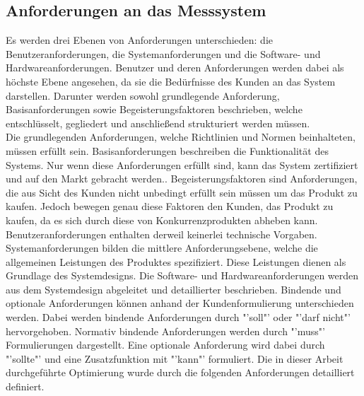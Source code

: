 \subsection{Anforderungen an das Messsystem}\label{sec:anforderungen}
Es werden drei Ebenen von Anforderungen unterschieden: die Benutzeranforderungen, die Systemanforderungen und die Software- und Hardwareanforderungen.\newline
Benutzer und deren Anforderungen werden dabei als höchste Ebene angesehen, da sie die Bedürfnisse des Kunden an das System darstellen. Darunter werden sowohl grundlegende Anforderung, Basisanforderungen sowie Begeisterungsfaktoren beschrieben, welche entschlüsselt, gegliedert und anschließend strukturiert werden müssen.\\
Die grundlegenden Anforderungen, welche Richtlinien und Normen beinhalteten, müssen erfüllt sein. Basisanforderungen beschreiben die Funktionalität des Systems. Nur wenn diese Anforderungen erfüllt sind, kann das System zertifiziert und auf den Markt gebracht werden.. Begeisterungsfaktoren sind Anforderungen, die aus Sicht des Kunden nicht unbedingt erfüllt sein müssen um das Produkt zu kaufen. Jedoch bewegen genau diese Faktoren den Kunden, das Produkt zu kaufen, da es sich durch diese von Konkurrenzprodukten abheben kann. Benutzeranforderungen enthalten derweil keinerlei technische Vorgaben.\newline
Systemanforderungen bilden die mittlere Anforderungsebene, welche die allgemeinen Leistungen des Produktes spezifiziert. Diese Leistungen dienen als Grundlage des Systemdesigns.\newline
Die Software- und Hardwareanforderungen werden aus dem Systemdesign abgeleitet und detaillierter beschrieben.\newline %
Bindende und optionale Anforderungen können anhand der Kundenformulierung unterschieden werden. Dabei werden bindende Anforderungen durch "'soll"' oder "'darf nicht"' hervorgehoben. Normativ bindende Anforderungen werden durch "'muss"' Formulierungen dargestellt. Eine optionale Anforderung wird dabei durch "'sollte"' und eine Zusatzfunktion mit "'kann"' formuliert.\newline
Die in dieser Arbeit durchgeführte Optimierung wurde durch die folgenden Anforderungen detailliert definiert.
